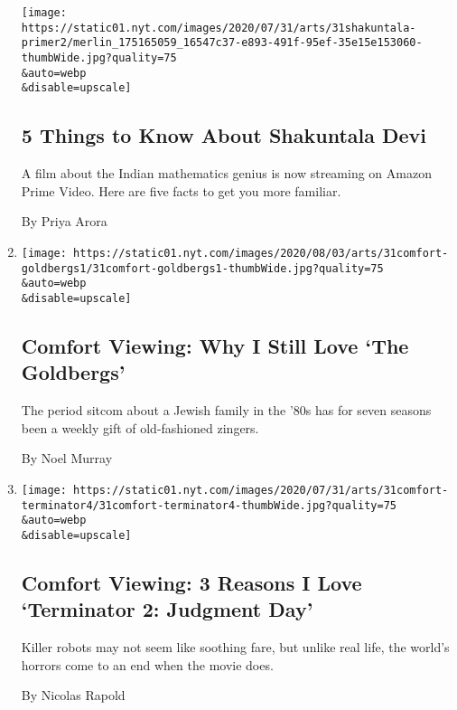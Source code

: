 \begin{enumerate}
  \texttt{[image: https://static01.nyt.com/images/2020/07/31/arts/31shakuntala-primer2/merlin\_175165059\_16547c37-e893-491f-95ef-35e15e153060-thumbWide.jpg?quality=75\\\&auto=webp\\\&disable=upscale]}

  \hypertarget{5-things-to-know-about-shakuntala-devi}{%
  \subsection{5 Things to Know About Shakuntala
  Devi}\label{5-things-to-know-about-shakuntala-devi}}

  A film about the Indian mathematics genius is now streaming on Amazon
  Prime Video. Here are five facts to get you more familiar.

  By Priya Arora
\item
  \href{/2020/07/31/arts/television/goldbergs-abc-stream.html}{}

  \texttt{[image: https://static01.nyt.com/images/2020/08/03/arts/31comfort-goldbergs1/31comfort-goldbergs1-thumbWide.jpg?quality=75\\\&auto=webp\\\&disable=upscale]}

  \hypertarget{comfort-viewing-why-i-still-love-the-goldbergs}{%
  \subsection{Comfort Viewing: Why I Still Love `The
  Goldbergs'}\label{comfort-viewing-why-i-still-love-the-goldbergs}}

  The period sitcom about a Jewish family in the '80s has for seven
  seasons been a weekly gift of old-fashioned zingers.

  By Noel Murray
\item
  \href{/2020/07/31/movies/comfort-viewing-terminator-2.html}{}

  \texttt{[image: https://static01.nyt.com/images/2020/07/31/arts/31comfort-terminator4/31comfort-terminator4-thumbWide.jpg?quality=75\\\&auto=webp\\\&disable=upscale]}

  \hypertarget{comfort-viewing-3-reasons-i-love-terminator-2-judgment-day}{%
  \subsection{Comfort Viewing: 3 Reasons I Love `Terminator 2: Judgment
  Day'}\label{comfort-viewing-3-reasons-i-love-terminator-2-judgment-day}}

  Killer robots may not seem like soothing fare, but unlike real life,
  the world's horrors come to an end when the movie does.

  By Nicolas Rapold
\end{enumerate}

